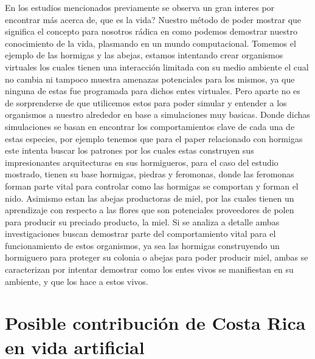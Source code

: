 \documentclass[conference]{IEEEtran}
\begin{document}
En los estudios mencionados previamente se observa un gran inter\’es por encontrar m\'as acerca de, que es la vida? Nuestro m\'etodo de poder mostrar qu\’e significa el concepto para nosotros r\'adica en com\’o podemos demostrar nuestro conocimiento de la vida, plasmando en un mundo computacional. 
Tomemos el ejemplo de las hormigas y las abejas, estamos intentando crear organismos virtuales los cuales tienen una interacci\'on limitada con su medio ambiente el cual no cambia ni tampoco muestra amenazas potenciales para los mismos, ya que ninguna de estas fue programada para dichos entes virtuales. Pero aparte no es de sorprenderse de que utilicemos estos para poder simular y entender a los organismos a nuestro alrededor en base a simulaciones muy b\’asicas. Donde dichas simulaciones se basan en encontrar los comportamientos clave de cada una de estas especies, por ejemplo tenemos que para el paper relacionado con hormigas este intenta buscar los patrones por los cuales estas construyen sus impresionantes arquitecturas en sus hormigueros, para el caso del estudio mostrado, tienen su base hormigas, piedras y feromonas, donde las feromonas forman parte vital para controlar c\’omo las hormigas se comportan y forman el nido. 
Asimismo est\’an las abejas productoras de miel, por las cuales tienen un aprendizaje con respecto a las flores que son potenciales proveedores de polen para producir su preciado producto, la miel. 
Si se analiza a detalle ambas investigaciones buscan demostrar parte del comportamiento vital para el funcionamiento de estos organismos, ya sea las hormigas construyendo un hormiguero para proteger su colonia o abejas para poder producir miel, ambas se caracterizan por intentar demostrar como los entes vivos se manifiestan en su ambiente, y que los hace a estos vivos. 

\section{Posible contribuci\'on de Costa Rica en vida artificial}
\end{document}
